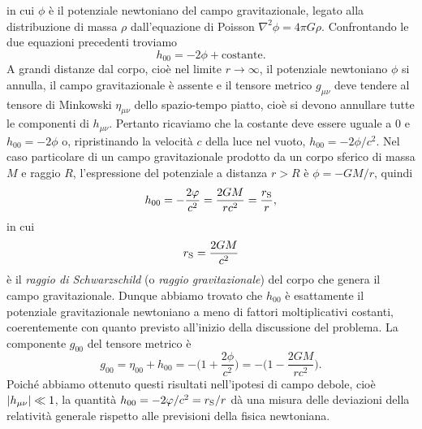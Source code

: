 in cui $\phi$ è il potenziale newtoniano del campo gravitazionale, legato alla
distribuzione di massa $\rho$
dall'equazione di
Poisson $\nabla^{2} \phi = 4\pi G\rho$.  Confrontando le due equazioni
precedenti troviamo
\begin{equation}
  h_{00} = -2\phi + \text{costante}.
\end{equation}
A grandi distanze dal corpo, cioè nel limite $r \to \infty$, il potenziale
newtoniano $\phi$ si annulla, il campo gravitazionale è assente e il tensore
metrico $g_{\mu\nu}$ deve tendere al tensore di Minkowski $\eta_{\mu\nu}$ dello
spazio-tempo piatto, cioè si devono annullare tutte le componenti di
$h_{\mu\nu}$.  Pertanto ricaviamo che la costante deve essere uguale a $0$ e
$h_{00} = -2\phi$ o, ripristinando la velocità $c$ della luce nel vuoto,
$h_{00} = -2\phi/c^{2}$.  Nel caso particolare di un campo gravitazionale
prodotto da un corpo sferico di massa $M$ e raggio $R$, l'espressione del
potenziale a distanza $r > R$ è $\phi = -GM/r$, quindi
\begin{equation}
  \label{eq:h00}
  h_{00} = -\frac{2\phi}{c^{2}} = \frac{2GM}{rc^{2}} = \frac{r_{\textup{S}}}{r},
\end{equation}
in cui
\begin{equation}
  r_{\textup{S}} = \frac{2GM}{c^{2}}
\end{equation}
è il \emph{raggio di Schwarzschild} (o
\emph{raggio gravitazionale}) del corpo che genera il campo gravitazionale.
Dunque abbiamo trovato che $h_{00}$ è esattamente il potenziale gravitazionale
newtoniano a meno di fattori moltiplicativi costanti, coerentemente con quanto
previsto all'inizio della discussione del problema.  La componente $g_{00}$ del
tensore metrico è
\begin{equation}
  g_{00} = \eta_{00} + h_{00} = -\bigg(1 + \frac{2\phi}{c^{2}}\bigg) = -
  \bigg(1 - \frac{2GM}{rc^{2}} \bigg).
\end{equation}
Poiché abbiamo ottenuto questi risultati nell'ipotesi di campo debole, cioè
$\abs{h_{\mu\nu}} \ll 1$, la quantità $h_{00} = -2\phi/c^{2} = r_{\textup{S}}/r$
dà una misura delle deviazioni della relatività generale rispetto alle
previsioni della fisica newtoniana.


